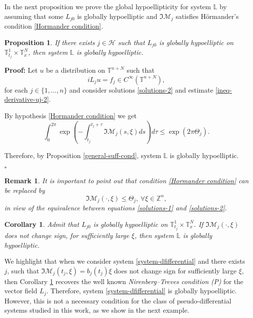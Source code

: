 \documentclass[12pt]{elsarticle}
\newtheorem{proposition}[theorem]{Proposition}
\newtheorem{remark}[theorem]{Remark}
\newtheorem{corollary}[theorem]{Corollary}
\numberwithin{equation}{section}
\newenvironment{proof}[1][\noindent \textbf{Proof: }]{#1}{ \hfill $\square$ \vspace{2mm}}
\begin{document}
In the next proposition we prove the global hypoellipticity for  system $\mathbb{L}$ by assuming that some $L_{j0}$ is globally hypoelliptic and $\Im \mathcal{M}_j$ satisfies  H\"{o}rmander's condition \eqref{Hormander condition}.   



\begin{proposition}\label{prop-hormander-system}
	If there exists $j \in \mathcal{H}$ such that $L_{j0}$  is globally hypoelliptic on $\mathbb{T}_{t_j}^1\times\mathbb{T}_x^N$, then  system $\mathbb{L}$ is globally hypoelliptic.
\end{proposition}


\begin{proof}
	Let $u$ be a distribution  on $\mathbb{T}^{n+N}$ such that  
	$$
	iL_ju=f_j\in C^\infty(\mathbb{T}^{n+N}),
	$$
	for each $j \in \{1,\ldots, n\}$ and consider  solutions 
	\eqref{solutions-2} and  estimate \eqref{ineq-derivative-uj-2}. 
	
	By hypothesis \eqref{Hormander condition} we get
	$$
	\int_{0}^{2\pi} \exp \left(-\int_{t_j}^{t_j+\tau}\Im \mathcal{M}_j(s,\xi)ds \right)d\tau  \leq \exp(2 \pi \Theta_j).
	$$
	
	Therefore, by Proposition \ref{general-suff-cond}, system $\mathbb{L}$ is globally hypoelliptic.
	
\end{proof}


\begin{remark}
It is important to point out that  condition  \eqref{Hormander condition} can be replaced by 
\begin{equation*}\label{Horm_cond-system-2}
\Im \mathcal{M}_j(\cdot, \xi) \leq \Theta_j, \  \forall \xi \in \mathbb{Z}^n,
\end{equation*}
in view of the equivalence between equations \eqref{solutions-1} and \eqref{solutions-2}.
\end{remark}




\begin{corollary}\label{coro-nao-muda-sign}	
	Admit that 	$L_{j0}$ is globally hypoelliptic on $\mathbb{T}_{t_j}^1\times\mathbb{T}_x^N$. If $\Im \mathcal{M}_j( \cdot , \xi)$ does not change sign, for sufficiently large $\xi$, then  system $\mathbb{L}$ is globally hypoelliptic.
\end{corollary}


	We highlight that when we consider system  \eqref{system-dfifferential} and there exists $j$, such that $\Im\mathcal{M}_j(t_j, \xi) = b_j(t_j)\xi$ does not change sign for sufficiently large $\xi$, then Corollary \ref{coro-nao-muda-sign} recovers the well known {\it Nirenberg–Treves condition (P)} for the vector field $L_j$. Therefore,  system \eqref{system-dfifferential} is globally hypoelliptic.  However, this is not a necessary condition for the class of  pseudo-differential systems studied in this work, as we show in the next example.
\end{document}
